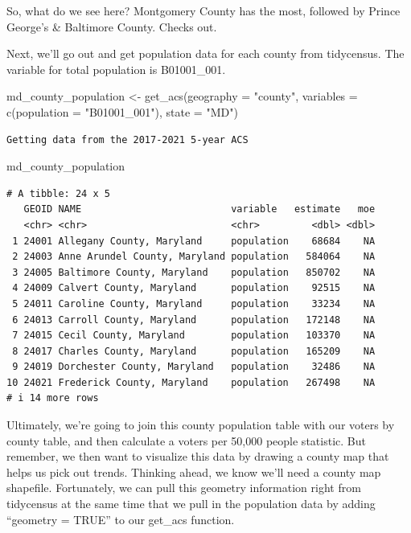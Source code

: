 \documentclass[
  letterpaper,
  DIV=11,
  numbers=noendperiod]{scrreprt}
\newenvironment{Shaded}{\begin{snugshade}}{\end{snugshade}}
\newcommand{\AttributeTok}[1]{\textcolor[rgb]{0.40,0.45,0.13}{#1}}
\newcommand{\FunctionTok}[1]{\textcolor[rgb]{0.28,0.35,0.67}{#1}}
\newcommand{\NormalTok}[1]{\textcolor[rgb]{0.00,0.23,0.31}{#1}}
\newcommand{\OtherTok}[1]{\textcolor[rgb]{0.00,0.23,0.31}{#1}}
\newcommand{\StringTok}[1]{\textcolor[rgb]{0.13,0.47,0.30}{#1}}
\begin{document}
So, what do we see here? Montgomery County has the most, followed by
Prince George's \& Baltimore County. Checks out.

Next, we'll go out and get population data for each county from
tidycensus. The variable for total population is B01001\_001.

\begin{Shaded}
\begin{Highlighting}[]
\NormalTok{md\_county\_population }\OtherTok{\textless{}{-}} \FunctionTok{get\_acs}\NormalTok{(}\AttributeTok{geography =} \StringTok{"county"}\NormalTok{,}
              \AttributeTok{variables =} \FunctionTok{c}\NormalTok{(}\AttributeTok{population =} \StringTok{"B01001\_001"}\NormalTok{),}
              \AttributeTok{state =} \StringTok{"MD"}\NormalTok{)}
\end{Highlighting}
\end{Shaded}

\begin{verbatim}
Getting data from the 2017-2021 5-year ACS
\end{verbatim}

\begin{Shaded}
\begin{Highlighting}[]
\NormalTok{md\_county\_population}
\end{Highlighting}
\end{Shaded}

\begin{verbatim}
# A tibble: 24 x 5
   GEOID NAME                          variable   estimate   moe
   <chr> <chr>                         <chr>         <dbl> <dbl>
 1 24001 Allegany County, Maryland     population    68684    NA
 2 24003 Anne Arundel County, Maryland population   584064    NA
 3 24005 Baltimore County, Maryland    population   850702    NA
 4 24009 Calvert County, Maryland      population    92515    NA
 5 24011 Caroline County, Maryland     population    33234    NA
 6 24013 Carroll County, Maryland      population   172148    NA
 7 24015 Cecil County, Maryland        population   103370    NA
 8 24017 Charles County, Maryland      population   165209    NA
 9 24019 Dorchester County, Maryland   population    32486    NA
10 24021 Frederick County, Maryland    population   267498    NA
# i 14 more rows
\end{verbatim}

Ultimately, we're going to join this county population table with our
voters by county table, and then calculate a voters per 50,000 people
statistic. But remember, we then want to visualize this data by drawing
a county map that helps us pick out trends. Thinking ahead, we know
we'll need a county map shapefile. Fortunately, we can pull this
geometry information right from tidycensus at the same time that we pull
in the population data by adding ``geometry = TRUE'' to our get\_acs
function.
\end{document}
